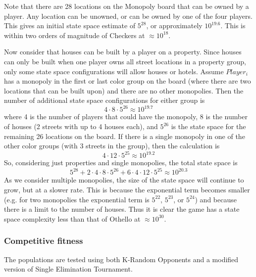 Note that there are 28 locations on the Monopoly board that can be owned by a
player. Any location can be unowned, or can be owned by one of the four players.
This gives an initial state space estimate of \(5^{28}\), or approximately
\(10^{19.6}\). This is within two orders of magnitude of Checkers at
\(\approx10^{18}\). 

Now consider that houses can be built by a player on a property. Since houses
can only be built when one player owns all street locations in a property group,
only some state space configurations will allow houses or hotels. Assume
\(Player_{i}\) has a monopoly in the first or last color group on the board
(where there are two locations that can be built upon) and there are no other
monopolies. Then the number of additional state space configurations for either
group is
\begin{equation*}
4 \cdot 8 \cdot 5^{26} \approx 10^{19.7}
\end{equation*}
where 4 is the number of players that could have the monopoly, 8 is the number
of houses (2 streets with up to 4 houses each), and \(5^{26}\) is the state
space for the remaining 26 locations on the board. If there is a single monopoly
in one of the other color groups (with 3 streets in the group), then the
calculation is
\begin{equation*}
4 \cdot 12 \cdot 5^{25} \approx 10^{19.2}
\end{equation*}
So, considering just properties and single monopolies, the total state space
is
\begin{equation*}
5^{28} + 2 \cdot 4 \cdot 8 \cdot 5^{26} + 6 \cdot 4 \cdot 12 \cdot 5^{25}
\approx 10^{20.3}
\end{equation*}
As we consider multiple monopolies, the size of the state space will continue to
grow, but at a slower rate. This is because the exponential term becomes smaller
(e.g. for two monopolies the exponential term is \(5^{22}\), \(5^{23}\), or
\(5^{24}\)) and because there is a limit to the number of houses. Thus it is
clear the game has a state space complexity less than that of Othello at
\(\approx10^{30}\).

\subsubsection{Competitive fitness} \label{5_compfit}

The populations are tested using both K-Random Opponents and a modified
version of Single Elimination Tournament.

